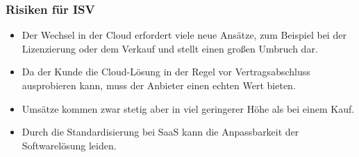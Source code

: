 \subsubsection{Risiken für ISV}
\begin{itemize}
	\item Der Wechsel in der Cloud erfordert viele neue Ansätze, zum
Beispiel bei der Lizenzierung oder dem Verkauf und stellt einen großen Umbruch
dar.
	\item Da der Kunde die Cloud-Lösung in der Regel vor
Vertragsabschluss ausprobieren kann, muss der Anbieter einen echten Wert
bieten.
	\item Umsätze kommen zwar stetig aber in viel geringerer Höhe als bei
einem Kauf.
	\item Durch die Standardisierung bei SaaS kann die Anpassbarkeit
der Softwarelösung leiden.
\end{itemize}

